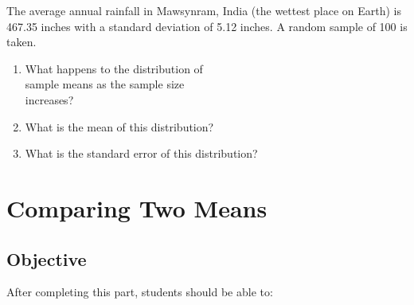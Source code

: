\documentclass[11pt, chapterprefix=true]{scrbook}\usepackage[]{graphicx}\usepackage[]{color}
\begin{document}
\begin{exercises}
\begin{exercise}
\end{exercise}
\begin{solution}  %

\end{solution}

\begin{exercise}  %

The average annual rainfall in Mawsynram, India (the wettest place on Earth) is 467.35 inches with a standard deviation of 5.12 inches. A random sample of 100 is taken.

\begin{enumerate}
  \item What happens to the distribution of \\ sample means as the sample size \\ increases?
  \item What is the mean of this distribution? 
  \item What is the standard error of this distribution?
\end{enumerate}

\end{exercise}
\begin{solution}  %

\end{solution}

\end{exercises}


\onecolumn



\chapter{Comparing Two Means}
\label{chap:ch11}

\section{Objective}

After completing this part, students should be able to:

\end{document}
